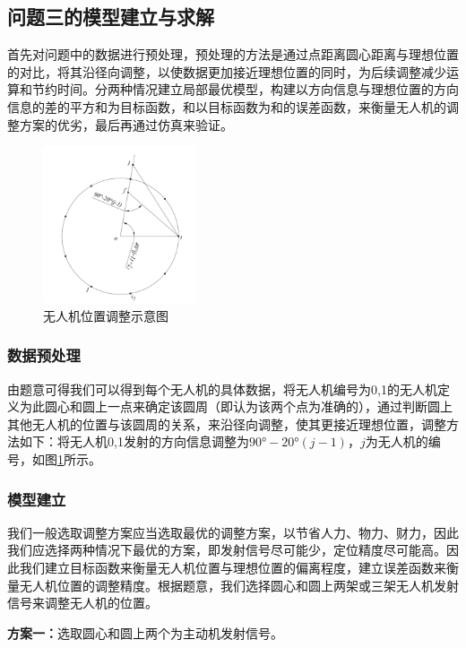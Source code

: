 \documentclass[withoutpreface,bwprint]{cumcmthesis} %
\begin{document}
\subsection{问题三的模型建立与求解}

首先对问题中的数据进行预处理，预处理的方法是通过点距离圆心距离与理想位置的对比，将其沿径向调整，以使数据更加接近理想位置的同时，为后续调整减少运算和节约时间。分两种情况建立局部最优模型，构建以方向信息与理想位置的方向信息的差的平方和为目标函数，和以目标函数为和的误差函数，来衡量无人机的调整方案的优劣，最后再通过仿真来验证。
\begin{figure}[H]
    \centering
    \includegraphics[width=0.4\textwidth]{../figure/q3_1.png} 
    \caption{无人机位置调整示意图}
    \label{q3_1}    
\end{figure}
\subsubsection{数据预处理}
由题意可得我们可以得到每个无人机的具体数据，将无人机编号为0,1的无人机定义为此圆心和圆上一点来确定该圆周（即认为该两个点为准确的），通过判断圆上其他无人机的位置与该圆周的关系，来沿径向调整，使其更接近理想位置，调整方法如下：将无人机0,1发射的方向信息调整为$90°-20°(j-1)$，$j$为无人机的编号，如图\ref{q3_1}所示。



\subsubsection{模型建立}

我们一般选取调整方案应当选取最优的调整方案，以节省人力、物力、财力，因此我们应选择两种情况下最优的方案，即发射信号尽可能少，定位精度尽可能高。因此我们建立目标函数来衡量无人机位置与理想位置的偏离程度，建立误差函数来衡量无人机位置的调整精度。根据题意，我们选择圆心和圆上两架或三架无人机发射信号来调整无人机的位置。

\noindent \textbf{方案一：}选取圆心和圆上两个为主动机发射信号。
    
\end{document}
